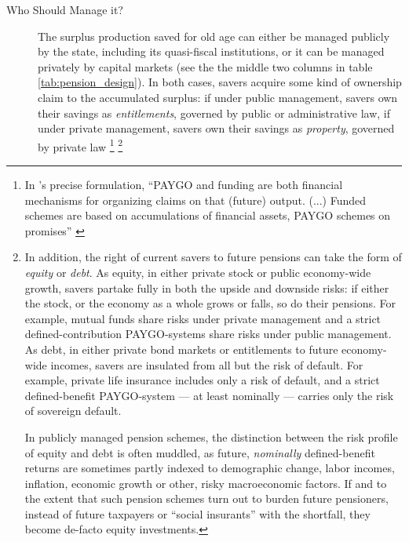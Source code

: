 \documentclass[11pt,a4paper,oneside,openright]{article}
\begin{document}
\begin{description}
	\item[Who Should Manage it?] The surplus production saved for old age can either be managed publicly by the state, including its quasi-fiscal institutions, or it can be managed privately by capital markets (see the the middle two columns in table \ref{tab:pension_design}). 
	In both cases, savers acquire some kind of ownership claim to the accumulated surplus: 
	if under public management, savers own their savings as \emph{entitlements}, governed by public or administrative law, if under private management, savers own their savings as \emph{property}, governed by private law
	\footnote{
		In \citeauthor{Barr2005a}'s precise formulation, ``PAYGO and funding are both financial mechanisms for organizing claims on that (future) output. 
		(...) 
		Funded schemes are based on accumulations of financial assets, PAYGO schemes on promises'' \citeyearpar[157]{Barr2005a}
	} 
	\footnote{
		In addition, the right of current savers to future pensions can take the form of \emph{equity} or \emph{debt}. 
		As equity, in either private stock or public economy-wide growth, savers partake fully in both the upside and downside risks: 
		if either the stock, or the economy as a whole grows or falls, so do their pensions. 
		For example, mutual funds share risks under private management and a strict defined-contribution PAYGO-systems share risks under public management. 
		As debt, in either private bond markets or entitlements to future economy-wide incomes, savers are insulated from all but the risk of default. 
		For example, private life insurance includes only a risk of default, and a strict defined-benefit PAYGO-system --- at least nominally --- carries only the risk of sovereign default.
		
		In publicly managed pension schemes, the distinction between the risk profile of equity and debt is often muddled, as future, \emph{nominally} defined-benefit returns are sometimes partly indexed to demographic change, labor incomes, inflation, economic growth or other, risky macroeconomic factors. 
		If and to the extent that such pension schemes turn out to burden future pensioners, instead of future taxpayers or ``social insurants'' with the shortfall, they become de-facto equity investments.
		
}
\end{description}
\end{document}
